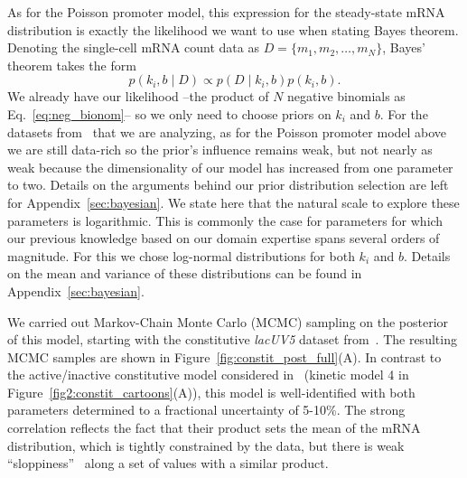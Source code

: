 As for the Poisson promoter model, this expression for the steady-state mRNA
distribution is exactly the likelihood we want to use when stating Bayes
theorem. Denoting the single-cell mRNA count data as $D=\{m_1, m_2,\dots,
m_N\}$, Bayes' theorem takes the form
\begin{equation}
p(k_i, b \mid D) \propto p(D\mid k_i,b)p(k_i, b).
\end{equation}
We already have our likelihood --the product of $N$ negative binomials as
Eq.~\ref{eq:neg_bionom}-- so we only need to choose priors on $k_i$ and $b$. For
the datasets from~\cite{Jones2014} that we are analyzing, as for the Poisson
promoter model above we are still data-rich so the prior's influence remains
weak, but not nearly as weak because the dimensionality of our model has
increased from one parameter to two. Details on the arguments behind our prior
distribution selection are left for Appendix~\ref{sec:bayesian}. We state here
that the natural scale to explore these parameters is logarithmic. This is
commonly the case for parameters for which our previous knowledge based on our
domain expertise spans several orders of magnitude. For this we chose log-normal
distributions for both $k_i$ and $b$. Details on the mean and variance of these
distributions can be found in Appendix~\ref{sec:bayesian}.

We carried out Markov-Chain Monte Carlo (MCMC) sampling on the posterior of this
model, starting with the constitutive \textit{lacUV5} dataset
from~\cite{Jones2014}. The resulting MCMC samples are shown in
Figure~\ref{fig:constit_post_full}(A). In contrast to the active/inactive
constitutive model considered in~\cite{Razo-Mejia2020} (kinetic model 4 in
Figure~\ref{fig2:constit_cartoons}(A)), this model is well-identified with both
parameters determined to a fractional uncertainty of 5-10\%. The strong
correlation reflects the fact that their product sets the mean of the mRNA
distribution, which is tightly constrained by the data, but there is weak
``sloppiness''~\cite{Transtrum2015} along a set of values with a similar
product.

